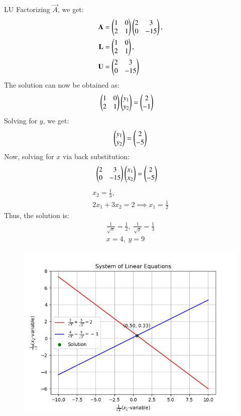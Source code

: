 \documentclass[journal]{IEEEtran}
\begin{document}
LU Factorizing \(\vec{A}\), we get:
\begin{align}
    \mathbf{A} &= \begin{pmatrix}1 & 0\\2 & 1\end{pmatrix}\begin{pmatrix}2 & 3\\0 & -15\end{pmatrix}, \\
    \mathbf{L} &= \begin{pmatrix}1 & 0\\2 & 1\end{pmatrix}, \\
    \mathbf{U} &= \begin{pmatrix}2 & 3\\0 & -15\end{pmatrix}
\end{align}
The solution can now be obtained as:
\begin{align}
    \begin{pmatrix}1 & 0\\2 & 1\end{pmatrix}\begin{pmatrix}y_1 \\ y_2\end{pmatrix} &= \begin{pmatrix}2 \\-1\end{pmatrix}
\end{align}
Solving for \(y\), we get:
\begin{align}
    \begin{pmatrix}y_1 \\ y_2\end{pmatrix} = \begin{pmatrix}2 \\ -5\end{pmatrix}
\end{align}
Now, solving for \(x\) via back substitution:
\begin{align}
    \begin{pmatrix}2 & 3\\0 & -15\end{pmatrix}\begin{pmatrix}x_1 \\ x_2\end{pmatrix} &= \begin{pmatrix}2 \\ -5\end{pmatrix}
\end{align}
\begin{align}
    x_2 = \frac{1}{3}, \\
    2 x_1 + 3 x_2 = 2 \implies x_1 = \frac{1}{2}
\end{align}
Thus, the solution is:
\begin{align}
    \frac{1}{\sqrt{x}} = \frac{1}{2}, \; \frac{1}{\sqrt{y}} = \frac{1}{3} \\
    x = 4, \; y = 9
\end{align}
\begin{figure}[H]
    \centering
    \includegraphics[width=\columnwidth]{figs/fig.png}
\end{figure}
\end{document}
